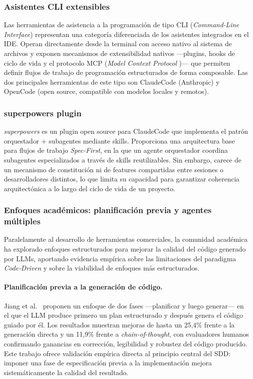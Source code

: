 \documentclass[11pt, letterpaper]{article}
\begin{document}
\subsubsection{Asistentes CLI extensibles}
\label{sec:asistentes_cli}
Las herramientas de asistencia a la programación de tipo CLI (\textit{Command-Line Interface}) representan una categoría diferenciada de los asistentes integrados en el IDE. Operan directamente desde la terminal con acceso nativo al sistema de archivos y exponen mecanismos de extensibilidad nativos ---plugins, hooks de ciclo de vida y el protocolo MCP (\textit{Model Context Protocol} \cite{anthropic_mcp_2024})--- que permiten definir flujos de trabajo de programación estructurados de forma composable. Las dos principales herramientas de este tipo son ClaudeCode \cite{claude_code_2024} (Anthropic) y OpenCode \cite{opencode_2025} (open source, compatible con modelos locales y remotos).

\subsubsection{superpowers plugin}
\label{sec:superpowers}
\textit{superpowers} \cite{superpowers_2025} es un plugin open source para ClaudeCode que implementa el patrón orquestador + subagentes mediante skills. Proporciona una arquitectura base para flujos de trabajo \textit{Spec-First}, en la que un agente orquestador coordina subagentes especializados a través de skills reutilizables. Sin embargo, carece de un mecanismo de constitución ni de features compartidas entre sesiones o desarrolladores distintos, lo que limita su capacidad para garantizar coherencia arquitectónica a lo largo del ciclo de vida de un proyecto.

\subsubsection{Enfoques académicos: planificación previa y agentes múltiples}
\label{sec:enfoques_academicos}

Paralelamente al desarrollo de herramientas comerciales, la comunidad académica ha explorado enfoques estructurados para mejorar la calidad del código generado por LLMs, aportando evidencia empírica sobre las limitaciones del paradigma \textit{Code-Driven} y sobre la viabilidad de enfoques más estructurados.

\paragraph{Planificación previa a la generación de código.}
Jiang et al.\ \cite{jiang2023selfplanning} proponen un enfoque de dos fases ---planificar y luego generar--- en el que el LLM produce primero un plan estructurado y después genera el código guiado por él. Los resultados muestran mejoras de hasta un 25,4\% frente a la generación directa y un 11,9\% frente a \textit{chain-of-thought}, con evaluadores humanos confirmando ganancias en corrección, legibilidad y robustez del código producido. Este trabajo ofrece validación empírica directa al principio central del SDD: imponer una fase de especificación previa a la implementación mejora sistemáticamente la calidad del resultado.
\end{document}
